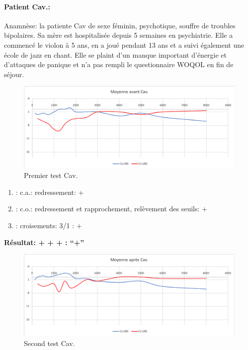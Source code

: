 \paragraph{ Patient Cav.: }
Anamnèse: la patiente Cav de sexe féminin, psychotique, souffre de troubles bipolaires. Sa mère est 
hospitalisée depuis 5 semaines en psychiatrie.
Elle  a commencé le violon à 5 ans, en a joué pendant 13 ans et a suivi également une école de jazz en 
chant. Elle se plaint d'un manque important d'énergie et d'attaques de panique et n'a pas rempli le 
questionnaire WOQOL en fin de séjour.
\begin{figure}%
\centering
\includegraphics[width=1\linewidth]{images/graphiques/cav_pre.png}
\caption[Patient Cav. : 1° test]{Premier test Cav.}

\end{figure}

	\begin{enumerate}

 		\item : c.a.: redressement: +

 		\item : c.o.: redressement et rapprochement, relèvement des seuils: +
 		\item : croisements: 3/1 :  +

                \end{enumerate}

                \textbf{ Résultat:  + + +       : ``+''}

                \begin{figure}%
\centering
\includegraphics[width=1\linewidth]{images/graphiques/cav_post.png}
\caption[Patient Cav. : 2° test]{Second test Cav.}

                \end{figure}
            
